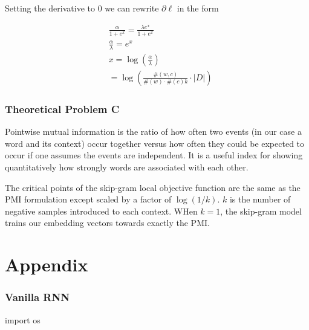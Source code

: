 Setting the derivative to $0$ we can rewrite $\partial \ell$ in the form

\begin{align*}
     & \frac{\alpha}{1 + e^x} = \frac{\lambda e^x}{1 + e^x}             \\
     & \frac{\alpha}{\lambda} = e^x                                     \\
     & x = \log(\frac{\alpha}{\lambda})                                 \\
     & =\log \left(\frac{\#(w, c)}{\#(w) \cdot \#(c) k} \cdot|D|\right)
\end{align*}

\subsection*{Theoretical Problem C}
Pointwise mutual information is the ratio of how often two events (in our case a word and its context) occur together versus how often they could be expected to occur if one assumes the events are independent. It is a useful index for showing quantitatively how strongly words are associated with each other.

The critical points of the skip-gram local objective function are the same as the PMI formulation except scaled by a factor of $\log(1/k)$. $k$ is the number of negative samples introduced to each context. WHen $k=1$, the skip-gram model trains our embedding vectors towards exactly the PMI.

\chapter*{Appendix}
\subsection*{Vanilla RNN}
\begin{python}
    import os
\end{python}

